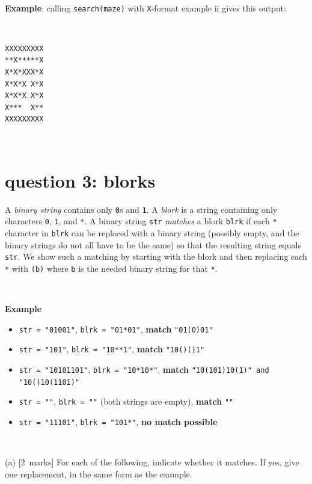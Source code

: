 \documentclass[12pt]{article}
\newcommand{\mymarks}[1]{\mbox{\small [#1 marks]}}
\begin{document}
~

\noindent
\begin{minipage}[c]{13cm}
{\bf Example}: calling \texttt{search(maze)} with \verb&X&-format 
example ii gives this output:
\end{minipage}~ ~ ~
\begin{minipage}[c]{4cm}
{\small\begin{verbatim}
XXXXXXXXX
**X*****X
X*X*XXX*X
X*X*X X*X
X*X*X X*X
X***  X**
XXXXXXXXX
\end{verbatim}}
\end{minipage}
\vfill~


\newpage
\section*{question 3: blorks}

A {\em binary string} contains only \verb&0&s and \verb&1&.
A {\em blork} is a string containing only characters \verb&0&, \verb&1&, and \verb&*&. 
A binary string \verb&str& {\em matches} a blork \verb&blrk&
if each \verb&*& character in \verb&blrk& 
can be replaced with a binary string (possibly empty, and the
binary strings do not all have to be the same)
so that the resulting string equals \verb&str&. 
We show such a matching by 
starting with the blork and then
replacing each \verb&*& with \verb&(b)& where \verb&b& is
the needed binary string for that \verb&*&.

~

\noindent
{\bf Example}
\begin{itemize}
\item \verb&str = "01001"&, \verb&blrk = "01*01"&,
{\bf match} \verb&"01(0)01"&
\item \verb&str = "101"&, \verb&blrk = "10**1"&, 
{\bf match} \verb&"10()()1"&
\item \verb&str = "10101101"&, \verb&blrk = "10*10*"&, 
{\bf match} \verb&"10(101)10(1)" and "10()10(1101)"&
\item \verb&str = ""&, \verb&blrk = ""& (both strings are empty), 
{\bf match} \verb&""&
\item \verb&str = "11101"&, \verb&blrk = "101*"&, {\bf no match possible}
\end{itemize}

~

(a) \mymarks{2}
For each of the following, indicate whether it matches. 
If yes, give one replacement, in the same form as the example.
\end{document}
